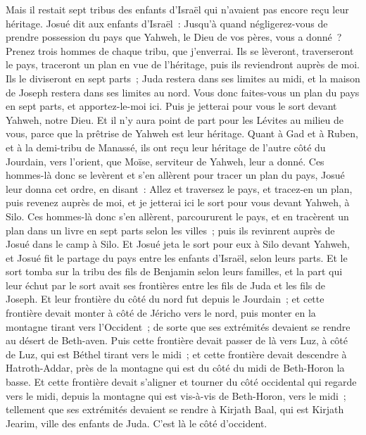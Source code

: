 \begin{multicols}{2}
Mais il restait sept tribus des enfants d'Israël qui n'avaient pas encore reçu leur héritage.
Josué dit aux enfants d'Israël~: Jusqu'à quand négligerez-vous de prendre possession du pays que Yahweh, le Dieu de vos pères, vous a donné~?
Prenez trois hommes de chaque tribu, que j'enverrai. Ils se lèveront, traverseront le pays, traceront un plan en vue de l'héritage, puis ils reviendront auprès de moi.
Ils le diviseront en sept parts~; Juda restera dans ses limites au midi, et la maison de Joseph restera dans ses limites au nord.
Vous donc faites-vous un plan du pays en sept parts, et apportez-le-moi ici. Puis je jetterai pour vous le sort devant Yahweh, notre Dieu.
Et il n'y aura point de part pour les Lévites au milieu de vous, parce que la prêtrise de Yahweh est leur héritage. Quant à Gad et à Ruben, et à la demi-tribu de Manassé, ils ont reçu leur héritage de l'autre côté du Jourdain, vers l'orient, que Moïse, serviteur de Yahweh, leur a donné.
Ces hommes-là donc se levèrent et s'en allèrent pour tracer un plan du pays, Josué leur donna cet ordre, en disant~: Allez et traversez le pays, et tracez-en un plan, puis revenez auprès de moi, et je jetterai ici le sort pour vous devant Yahweh, à Silo.
Ces hommes-là donc s'en allèrent, parcoururent le pays, et en tracèrent un plan dans un livre en sept parts selon les villes~; puis ils revinrent auprès de Josué dans le camp à Silo.
Et Josué jeta le sort pour eux à Silo devant Yahweh, et Josué fit le partage du pays entre les enfants d'Israël, selon leurs parts.
Et le sort tomba sur la tribu des fils de Benjamin selon leurs familles, et la part qui leur échut par le sort avait ses frontières entre les fils de Juda et les fils de Joseph.
Et leur frontière du côté du nord fut depuis le Jourdain~; et cette frontière devait monter à côté de Jéricho vers le nord, puis monter en la montagne tirant vers l'Occident~; de sorte que ses extrémités devaient se rendre au désert de Beth-aven. 
Puis cette frontière devait passer de là vers Luz, à côté de Luz, qui est Béthel tirant vers le midi~; et cette frontière devait descendre à Hatroth-Addar, près de la montagne qui est du côté du midi de Beth-Horon la basse. 
Et cette frontière devait s'aligner et tourner du côté occidental qui regarde vers le midi, depuis la montagne qui est vis-à-vis de Beth-Horon, vers le midi~; tellement que ses extrémités devaient se rendre à Kirjath Baal, qui est Kirjath Jearim, ville des enfants de Juda. C'est là le côté d'occident. 

\end{multicols}
